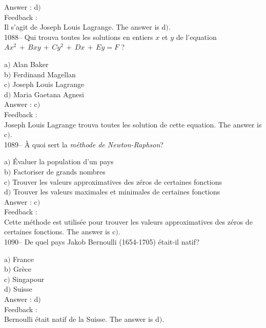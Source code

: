 ﻿\documentclass[letterpaper, 12pt]{article}
\begin{document}
Answer : d$)$\\

Feedback : \\
Il s'agit de Joseph Louis Lagrange.
The answer is d$)$.\\

1088-- Qui trouva toutes les solutions en entiers $x$ et $y$ de
l'equation $Ax^2\,+\,Bxy\,+\,Cy^2\,+\,Dx\,+\,Ey=F$ ?

a$)$ Alan Baker \\
b$)$ Ferdinand Magellan \\
c$)$ Joseph Louis Lagrange \\
d$)$ Maria Gaetana Agnesi\\

Answer : c$)$\\

Feedback : \\
Joseph Louis Lagrange trouva toutes les solution de cette
equation.
The answer is c$)$.\\

1089-- \`A quoi sert la {\sl m\'ethode de Newton-Raphson}?

a$)$ \'Evaluer la population d'un pays \\
b$)$ Factoriser de grands nombres \\
c$)$ Trouver les valeurs approximatives des z\'eros de certaines fonctions
\\
d$)$ Trouver les valeurs maximales et minimales de certaines fonctions\\

Answer : c$)$\\

Feedback : \\
Cette m\'ethode est utilis\'ee pour trouver les valeurs
approximatives des z\'eros de certaines fonctions. The answer is
c$)$.\\

1090-- De quel pays Jakob Bernoulli (1654-1705) \'etait-il natif?

a$)$ France  \\
b$)$ Gr\`ece  \\
c$)$ Singapour \\
d$)$ Suisse\\

Answer : d$)$\\

Feedback : \\
Bernoulli \'etait natif de la Suisse.
The answer is d$)$.\\
\end{document}

